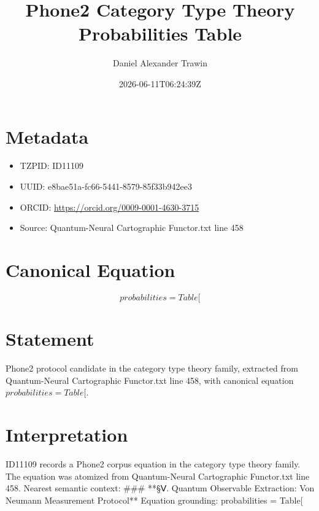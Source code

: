 \documentclass[11pt]{article}
\title{Phone2 Category Type Theory Probabilities Table}
\author{Daniel Alexander Trawin}
\date{2026-06-11T06:24:39Z}
\begin{document}
\maketitle
\section*{Metadata}
\begin{itemize}
\item TZPID: ID11109
\item UUID: e8bae51a-fc66-5441-8579-85f33b942ee3
\item ORCID: \url{https://orcid.org/0009-0001-4630-3715}
\item Source: Quantum-Neural Cartographic Functor.txt line 458
\end{itemize}
\section*{Canonical Equation}
\[
probabilities = Table[
\]
\section*{Statement}
Phone2 protocol candidate in the category type theory family, extracted from Quantum-Neural Cartographic Functor.txt line 458, with canonical equation $probabilities = Table[$.
\section*{Interpretation}
ID11109 records a Phone2 corpus equation in the category type theory family. The equation was atomized from Quantum-Neural Cartographic Functor.txt line 458. Nearest semantic context: ### **§Ⅴ. Quantum Observable Extraction: Von Neumann Measurement Protocol** Equation grounding: probabilities = Table[
\end{document}

